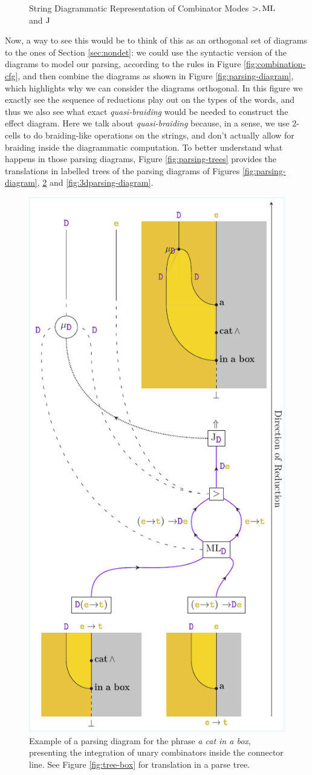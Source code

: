 \begin{figure}
	\centering
	
	\caption{String Diagrammatic Representation of Combinator Modes $>, \text{ML}$ and $\text{J}$}
	\label{fig:combinator-sd}
\end{figure}

Now, a way to see this would be to think of this as an orthogonal set of
diagrams to the ones of Section \ref{sec:nondet}: we could use the syntactic
version of the diagrams to model our parsing, according to the rules in
Figure \ref{fig:combination-cfg}, and then combine the diagrams as shown in
Figure \ref{fig:parsing-diagram}, which highlights why we can consider the
diagrams orthogonal.
In this figure we exactly see the sequence of reductions play out on the types
of the words, and thus we also see what exact \emph{quasi-braiding} would be
needed to construct the effect diagram.
Here we talk about \emph{quasi-braiding} because, in a sense, we use $2$-cells
to do braiding-like operations on the strings, and don't actually allow for
braiding inside the diagrammatic computation.
To better understand what happens in those parsing diagrams, Figure
\ref{fig:parsing-trees} provides the translations in labelled trees of the
parsing diagrams of Figures \ref{fig:parsing-diagram},
\ref{fig:parsing-diagram2} and \ref{fig:3dparsing-diagram}.

\begin{figure}
	\centering
	\includegraphics[width=.45\textwidth]{parsing-diagram2.pdf}
	\caption{Example of a parsing diagram for the phrase
		\emph{a cat in a box}, presenting the integration of unary combinators
		inside the connector line. See Figure \ref{fig:tree-box} for translation in
		a parse tree.}
	\label{fig:parsing-diagram2}
\end{figure}

